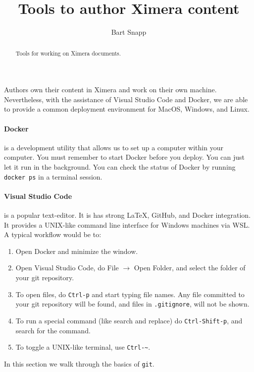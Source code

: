 \documentclass{ximera}
\title{Tools to author Ximera content}
\author{Bart Snapp}
\begin{document}
\begin{abstract}
    Tools for working on Ximera documents.
\end{abstract}
\maketitle

Authors own their content in Ximera and work on their own machine.
Nevertheless, with the assistance of Visual Studio Code and Docker, we are able
to provide a common deployment environment for MacOS, Windows, and Linux.


\paragraph{Docker} is a development utility that allows us to set up a computer
within your
computer. You must remember to start Docker before you deploy. You can just let
it run in the background. You can check the status of Docker by running
\verb!docker ps! in a terminal session.

\paragraph{Visual Studio Code}
is a popular text-editor. It is has strong \LaTeX, GitHub,
and Docker integration. It provides a UNIX-like command line interface for
Windows machines via WSL. A typical workflow would be to:
\begin{enumerate}
    \item Open Docker and minimize the window.
    \item Open Visual Studio Code, do File $\to$ Open Folder, and select the
          folder of your git repository.
    \item To open files, do \verb!Ctrl-p! and start typing file names. Any
          file
          committed to your git repository will be found, and files in
          \verb!.gitignore!, will not be shown.
    \item To run a special command (like search and replace) do
          \verb!Ctrl-Shift-p!, and search for the command.
    \item To toggle a UNIX-like terminal, use \verb!Ctrl-~!.
\end{enumerate}


In this section we walk through the basics of \verb!git!.
\end{document}
